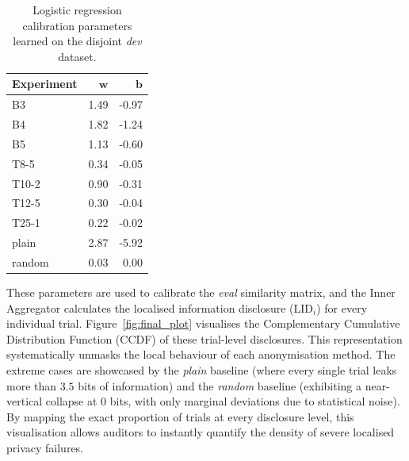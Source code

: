 \begin{table}[htbp]
\centering
\caption{Logistic regression calibration parameters learned on the disjoint \textit{dev} dataset.}
\begin{tabular}{lrr}
\toprule
\textbf{Experiment} & $\mathbf{w}$ & $\mathbf{b}$  \\
\midrule
B3      & 1.49 & -0.97 \\
B4      & 1.82 & -1.24 \\
B5      & 1.13 & -0.60 \\
T8-5    & 0.34 & -0.05 \\
T10-2   & 0.90 & -0.31 \\
T12-5   & 0.30 & -0.04 \\
T25-1   & 0.22 & -0.02 \\
\midrule
plain   & 2.87 & -5.92 \\
random  & 0.03 &  0.00 \\
\bottomrule
\end{tabular}
\label{tab:wb_metrics}
\end{table}


These parameters are used to calibrate the \textit{eval} similarity matrix, and the Inner Aggregator calculates the localised information disclosure ($\mathrm{LID}_i$) for every individual trial. Figure~\ref{fig:final_plot} visualises the Complementary Cumulative Distribution Function (CCDF) of these trial-level disclosures. This representation systematically unmasks the local behaviour of each anonymisation method. The extreme cases are showcased by the \textit{plain} baseline (where every single trial leaks more than $3.5$ bits of information) and the \textit{random} baseline (exhibiting a near-vertical collapse at $0$ bits, with only marginal deviations due to statistical noise). By mapping the exact proportion of trials at every disclosure level, this visualisation allows auditors to instantly quantify the density of severe localised privacy failures.




